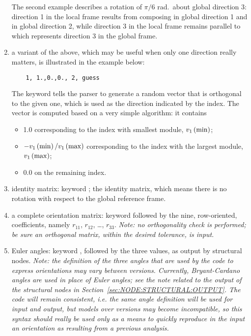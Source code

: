 \begin{enumerate}
    \noindent
    The second example describes a rotation of $ \pi/6 $ rad.\ about
    global direction 3: direction 1 in the local frame results from 
    composing  in global direction 1 and 
    in global direction 2, while direction 3 in the local frame remains
    parallel to  which represents direction 3 in the global
    frame.
    \item a variant of the above, which may be useful when only one
    direction really matters, is illustrated in the example below:
    \begin{verbatim}
    1, 1.,0.,0., 2, guess
    \end{verbatim}
    The keyword  tells the parser to generate a random vector
    that is orthogonal to the given one, which is used as the direction
    indicated by the index.
    The vector is computed based on a very simple algorithm: it contains
    \begin{itemize}
        \item 1.0 corresponding to the index with smallest module,
        $v_1\left( \mathrm{min} \right)$;
	\item $-v_1\left( \mathrm{min} \right)/v_1\left( \mathrm{max} \right)$
	corresponding to the index with the largest module,
	$v_1\left( \mathrm{max} \right)$;
	\item 0.0 on the remaining index.
    \end{itemize}
    \item identity matrix: keyword ; the identity matrix,
    which means there is no rotation with respect to the global reference
    frame.
    \item a complete orientation matrix: keyword 
    followed by the nine, row-oriented, coefficients, namely
    $ r_{11} $, $ r_{12} $, \ldots, $ r_{33} $.
    \emph{Note: no orthogonality check is performed; be sure an orthogonal
    matrix, within the desired tolerance, is input}.
    \item Euler angles: keyword , followed by the three
    values, as output by structural nodes.
    \emph{Note: the definition of the three angles that are used 
    by the code to express orientations may vary between versions.
    Currently, Bryant-Cardano angles are used in place of Euler
    angles; see the note related to the output of the structural nodes
    in Section~\ref{sec:NODE:STRUCTURAL:OUTPUT}.
    The code will remain consistent, i.e. the same angle
    definition will be used for input and output, but models
    over versions may become incompatible, so this syntax should 
    really be used only as a means to quickly reproduce in the input
    an orientation as resulting from a previous analysis.}
\end{enumerate}
